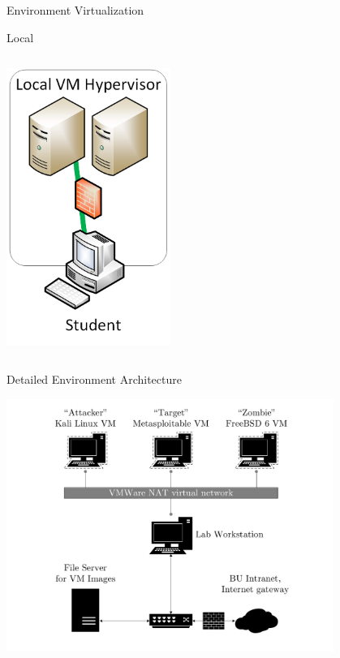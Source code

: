 \documentclass{beamer}
\begin{document}
\begin{frame}{Environment Virtualization}
{\begin{block}{Local}
\begin{columns}
            		\begin{column}{0.5\textwidth}
				\begin{center}
                 		\includegraphics[width=0.4\textwidth]{local-virt.png}
				\end{center}
              		\end{column}
            		\end{columns}		
		\end{block}	}	
	\end{frame}	

	\begin{frame}{Detailed Environment Architecture}
		\begin{center}
		\includegraphics[page=1,width=0.8\textwidth]{../paper/ec521_hostmap.pdf}
		\end{center}
	\end{frame}
\end{document}
